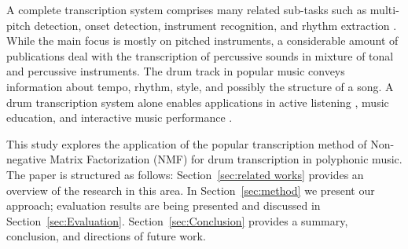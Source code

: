 \documentclass{article}
\newcommand{\secref}[1]{\mbox{Section~\ref{#1}}}
\begin{document}

A complete transcription system comprises many related sub-tasks such as multi-pitch detection, onset detection, instrument recognition, and rhythm extraction \cite{benetos_automatic_2013}. While the main focus is mostly on pitched instruments, a considerable amount of publications deal with the transcription of percussive sounds in mixture of tonal and percussive instruments. The drum track in popular music conveys information about tempo, rhythm, style, and possibly the structure of a song. A drum transcription system alone enables applications in active listening \cite{yoshii_drumix:_2007}, music education, and interactive music performance \cite{weinberg_interactive_2009}.


This study explores the application of the popular transcription method of Non-negative Matrix Factorization (NMF) for drum transcription in polyphonic music. The paper is structured as follows: \secref{sec:related works} provides an overview of the research in this area. In \secref{sec:method} we present our approach; evaluation results are being presented and discussed in \secref{sec:Evaluation}. \secref{sec:Conclusion} provides a summary, conclusion, and directions of future work. 

\vspace{-2mm}
\end{document}
